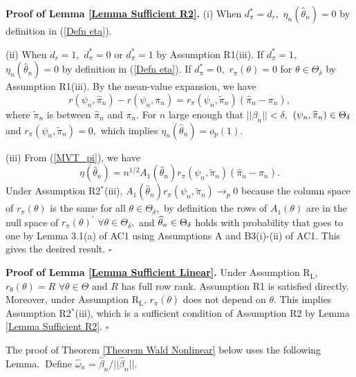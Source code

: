 \documentclass[12pt,titlepage,final,oneside,letterpaper]{article}
\begin{document}
\noindent \textbf{Proof of Lemma \ref{Lemma Sufficient R2}. }(i) When $%
d_{\pi }^{\ast }=d_{r},$ $\eta _{n}(\widehat{\theta }_{n})=0$ by definition
in (\ref{Defn eta}).

(ii) When $d_{r}=1,$ $d_{\pi }^{\ast }=0$ or $d_{\pi }^{\ast }=1$ by
Assumption R1(iii). If $d_{\pi }^{\ast }=1,$ $\eta _{n}(\widehat{\theta }%
_{n})=0$ by definition in (\ref{Defn eta}). If $d_{\pi }^{\ast }=0,$ $r_{\pi
}(\theta )=0$ for $\theta \in \Theta _{\delta }$ by Assumption R1(iii). By
the mean-value expansion, we have%
\begin{equation}
r(\psi _{n},\widehat{\pi }_{n})-r(\psi _{n},\pi _{n})=r_{\pi }(\psi _{n},%
\widetilde{\pi }_{n})(\widehat{\pi }_{n}-\pi _{n}),  \label{MVT_pi}
\end{equation}%
where $\widetilde{\pi }_{n}$ is between $\widehat{\pi }_{n}$ and $\pi _{n}.$
For $n$ large enough that $||\beta _{n}||<\delta ,$ $(\psi _{n},\widetilde{%
\pi }_{n})\in \Theta _{\delta }$ and $r_{\pi }(\psi _{n},\widetilde{\pi }%
_{n})=0,$ which implies $\eta _{n}(\widehat{\theta }_{n})=o_{p}(1).$

(iii) From (\ref{MVT_pi}), we have%
\begin{equation}
\eta (\widehat{\theta }_{n})=n^{1/2}A_{1}(\widehat{\theta }_{n})r_{\pi
}(\psi _{n},\widetilde{\pi }_{n})(\widehat{\pi }_{n}-\pi _{n}).
\end{equation}%
Under Assumption R2$^{\ast }$(iii), $A_{1}(\widehat{\theta }_{n})r_{\pi
}(\psi _{n},\widetilde{\pi }_{n})\rightarrow _{p}0$ because the column space
of $r_{\pi }(\theta )$ is the same for all $\theta \in \Theta _{\delta },$
by definition the rows of $A_{1}(\theta )$ are in the null space of $r_{\pi
}(\theta )^{\prime }$ $\forall \theta \in \Theta _{\delta },$ and $\widehat{%
\theta }_{n}\in \Theta _{\delta }$ holds with probability that goes to one
by Lemma 3.1(a) of AC1 using Assumptions A and B3(i)-(ii) of AC1. This gives
the desired result. $\square $\bigskip

\noindent \textbf{Proof of Lemma \ref{Lemma Sufficient Linear}. }Under
Assumption R$_{\text{L}}$, $r_{\theta }(\theta )=R$ $\forall \theta \in
\Theta $ and $R$ has full row rank. Assumption R1 is satisfied directly.
Moreover, under Assumption R$_{\text{L}}$, $r_{\pi }(\theta )$ does not
depend on $\theta .$ This implies Assumption R2$^{\ast }$(iii), which is a
sufficient condition of Assumption R2 by Lemma \ref{Lemma Sufficient R2}. $%
\square $\bigskip

The proof of Theorem \ref{Theorem Wald Nonlinear} below uses the following
Lemma.\textbf{\ }Define $\widehat{\omega }_{n}=\widehat{\beta }_{n}/||%
\widehat{\beta }_{n}||.$
\end{document}
